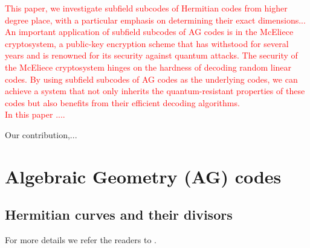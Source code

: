 \documentclass[a4paper]{amsart}
\theoremstyle{plain}
\theoremstyle{definition}
\theoremstyle{remark}
\begin{document}
\textcolor{red}{	This paper, we investigate subfield subcodes of Hermitian codes from higher degree place, with a particular emphasis on determining their exact dimensions...  \\An important application of subfield subcodes of AG codes is in the McEliece cryptosystem, a public-key encryption scheme that has withstood for several years and is renowned for its security against quantum attacks. The security of the McEliece cryptosystem hinges on the hardness of decoding random linear codes. By using subfield subcodes of AG codes as the underlying codes, we can achieve a system that not only inherits the quantum-resistant properties of these codes but also benefits from their efficient decoding algorithms.\\
	In this paper ....}

	
Our contribution,...	


\section{Algebraic Geometry (AG) codes \label{sec}}

\subsection*{Hermitian curves and their divisors}

For more details we refer the readers to \cite{stichtenoth2009algebraic, stepanov2012codes}.
\end{document}
